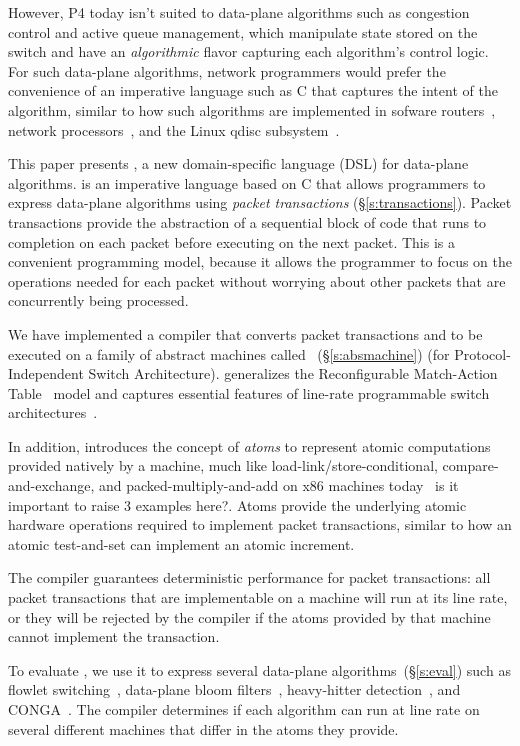 However, P4 today isn't suited to data-plane algorithms such as congestion
control and active queue management, which manipulate state stored on the
switch and have an \textit{algorithmic} flavor capturing each algorithm's
control logic.  For such data-plane algorithms, network programmers would
prefer the convenience of an imperative language such as C that captures the intent of
the algorithm, similar to how such algorithms are implemented in sofware
routers~\cite{click}, network processors~\cite{packetc, nova}, and the Linux
qdisc subsystem~\cite{qdisc}.

This paper presents \pktlanguage, a new domain-specific language (DSL) 
for data-plane algorithms.
\pktlanguage is an imperative language based on C that allows programmers to
express data-plane algorithms using {\em packet transactions}
(\S\ref{s:transactions}).  Packet transactions provide the abstraction of a
sequential block of code that runs to completion on each packet before
executing on the next packet. This is a convenient programming model, because
it allows the programmer to focus on the operations needed for each packet
without worrying about other packets that are concurrently being processed.

We have implemented a \pktlanguage compiler that converts  
packet transactions and to be executed on a family of abstract machines called
\absmachine~(\S\ref{s:absmachine}) (for Protocol-Independent Switch
Architecture). \absmachine generalizes the Reconfigurable Match-Action
Table~\cite{rmt} model and captures essential features of line-rate programmable
switch architectures~\cite{rmt, xpliant, flexpipe}.

In addition, \absmachine introduces the concept of {\em atoms} to represent
atomic computations provided natively by a \absmachine machine, much like
load-link/store-conditional, compare-and-exchange, and packed-multiply-and-add
on x86 machines today~\cite{x86_manual} \ac{is it important to raise 3 examples here?}. 
Atoms provide the underlying atomic
hardware operations required to implement packet transactions, similar to how
an atomic test-and-set can implement an atomic increment.

The \pktlanguage compiler guarantees deterministic performance for packet
transactions: all packet transactions that are implementable on a \absmachine
machine will run at its line rate, or they will be rejected by the compiler if
the atoms provided by that \absmachine machine cannot implement the
transaction.

To evaluate \pktlanguage, we use it to express several data-plane
algorithms~(\S\ref{s:eval}) such as flowlet switching~\cite{flowlets},
data-plane bloom filters~\cite{bloom}, heavy-hitter
detection~\cite{opensketch}, and CONGA~\cite{conga}.  The \pktlanguage compiler
determines if each algorithm can run at line rate on several different
\absmachine machines that differ in the atoms they provide.

